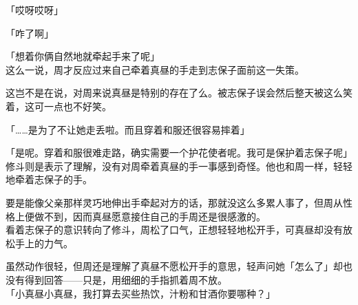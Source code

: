 「哎呀哎呀」

「咋了啊」

「想着你俩自然地就牵起手来了呢」\\

这么一说，周才反应过来自己牵着真昼的手走到志保子面前这一失策。

这岂不是在说，对周来说真昼是特别的存在了么。被志保子误会然后整天被这么笑着，这可一点也不好笑。

「……是为了不让她走丢啦。而且穿着和服还很容易摔着」

「是呢。穿着和服很难走路，确实需要一个护花使者呢。我可是保护着志保子呢」\\

修斗则是表示了理解，没有对周牵着真昼的手一事感到奇怪。他也和周一样，轻轻地牵着志保子的手。

要是能像父亲那样灵巧地伸出手牵起对方的话，那就没这么多累人事了，但周从性格上便做不到，因而真昼愿意接住自己的手周还是很感激的。\\

看着志保子的意识转向了修斗，周松了口气，正想轻轻地松开手，可真昼却没有放松手上的力气。

虽然动作很轻，但周还是理解了真昼不愿松开手的意思，轻声问她「怎么了」却也没有得到回答——只是，用细细的手指抓着周不放。\\

「小真昼小真昼，我打算去买些热饮，汁粉和甘酒你要哪种？」

